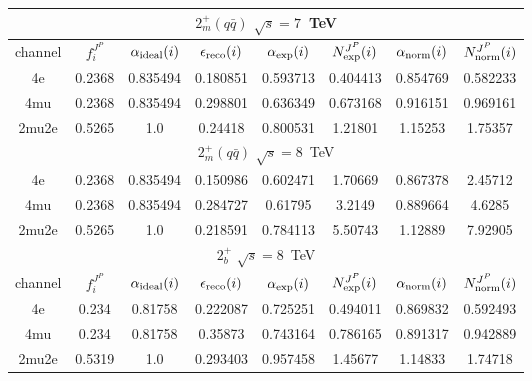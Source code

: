 \begin{table}[b]
\begin{tabular}{c c c c c c c c}
 \multicolumn{8}{|c|}{$2^{+}_{m} (q\bar{q})$ $\sqrt{s}=7$~TeV} \\ \hline 

channel & $f_{i}^{J^P}$ & $\alpha_{\rm ideal} (i)$ & $\epsilon_{\rm reco} (i)$ & $\alpha_{\rm exp} (i)$ & $N^{J^P}_{\rm exp} (i)$ & $\alpha_{\rm norm} (i)$ & $N^{J^P}_{\rm norm} (i)$\\ \hline 
4e & 0.2368 & 0.835494 & 0.180851 & 0.593713
 & 0.404413%
 & 0.854769 & 0.582233 \\ \hline 
4mu & 0.2368 & 0.835494 & 0.298801 & 0.636349
 & 0.673168%
 & 0.916151 & 0.969161 \\ \hline 
2mu2e & 0.5265 & 1.0  & 0.24418 & 0.800531
 & 1.21801%
 & 1.15253 & 1.75357 \\ \hline \hline 

 \multicolumn{8}{|c|}{$2^{+}_{m} (q\bar{q})$ $\sqrt{s}=8$~TeV} \\ \hline 

4e & 0.2368 & 0.835494 & 0.150986 & 0.602471
 & 1.70669%
 & 0.867378 & 2.45712 \\ \hline 
4mu & 0.2368 & 0.835494 & 0.284727 & 0.61795
 & 3.2149%
 & 0.889664 & 4.6285 \\ \hline 
2mu2e & 0.5265 & 1.0  & 0.218591 & 0.784113
 & 5.50743%
 & 1.12889 & 7.92905 \\ \hline \hline 

 \multicolumn{8}{|c|}{$2^{+}_{b}$ $\sqrt{s}=$8~TeV} \\ \hline 

channel & $f_{i}^{J^P}$ & $\alpha_{\rm ideal} (i)$ & $\epsilon_{\rm reco} (i)$ & $\alpha_{\rm exp} (i)$ & $N^{J^P}_{\rm exp} (i)$ & $\alpha_{\rm norm} (i)$ & $N^{J^P}_{\rm norm} (i)$\\ \hline 
4e & 0.234 & 0.81758 & 0.222087 & 0.725251
 & 0.494011%
 & 0.869832 & 0.592493 \\ \hline 
4mu & 0.234 & 0.81758 & 0.35873 & 0.743164
 & 0.786165%
 & 0.891317 & 0.942889 \\ \hline 
2mu2e & 0.5319 & 1.0  & 0.293403 & 0.957458
 & 1.45677%
 & 1.14833 & 1.74718 \\ \hline \hline 


\end{tabular}
\end{table}
